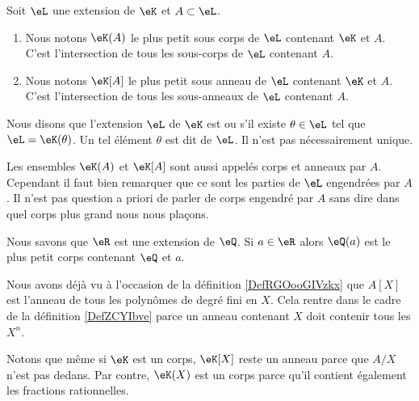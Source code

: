 \begin{definition}  \label{DefZCYIbve}
    Soit \( \eL\) une extension de \( \eK\) et \( A\subset \eL\). 
    \begin{enumerate}
        \item
            
    Nous notons \( \eK(A)\) le plus petit sous corps de \( \eL\) contenant \( \eK\) et \( A\). C'est l'intersection de tous les sous-corps de \( \eL\) contenant \( A\).
\item
    Nous notons \( \eK[A]\) le plus petit sous anneau de \( \eL\) contenant \( \eK\) et \( A\). C'est l'intersection de tous les sous-anneaux de \( \eL\) contenant \( A\).
    \end{enumerate}
    Nous disons que l'extension \( \eL\) de \( \eK\) est  ou  s'il existe \( \theta\in\eL\) tel que \( \eL=\eK(\theta)\). Un tel élément \( \theta\) est dit  de \( \eL\). Il n'est pas nécessairement unique.
\end{definition}

\begin{remark}
    Les ensembles \( \eK(A)\) et \( \eK[A]\) sont aussi appelés corps et anneaux  par \( A\). Cependant il faut bien remarquer que ce sont les parties de \( \eL\) engendrées par \( A\). Il n'est pas question a priori de parler de corps engendré par \( A\) sans dire dans quel corps plus grand nous nous plaçons.
\end{remark}

\begin{example}
    Nous savons que \( \eR\) est une extension de \( \eQ\). Si \( a\in \eR\) alors \( \eQ(a)\) est le plus petit corps contenant \( \eQ\) et \( a\).
\end{example}

\begin{example}
    Nous avons déjà vu à l'occasion de la définition \ref{DefRGOooGIVzkx} que \( A[X]\) est l'anneau de tous les polynômes de degré fini en \( X\). Cela rentre dans le cadre de la définition \ref{DefZCYIbve} parce un anneau contenant \( X\) doit contenir tous les \( X^n\).

    Notons que même si \( \eK\) est un corps, \( \eK[X]\) reste un anneau parce que \( A/X\) n'est pas dedans. Par contre, \( \eK(X)\) est un corps parce qu'il contient également les fractions rationnelles.
\end{example}

